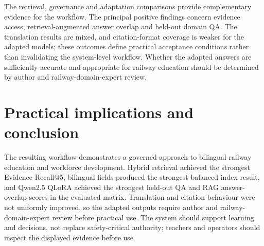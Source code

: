 The retrieval, governance and adaptation comparisons provide complementary evidence for the workflow. The principal positive findings concern evidence access, retrieval-augmented answer overlap and held-out domain QA. The translation results are mixed, and citation-format coverage is weaker for the adapted models; these outcomes define practical acceptance conditions rather than invalidating the system-level workflow. Whether the adapted answers are sufficiently accurate and appropriate for railway education should be determined by author and railway-domain-expert review.

\section{Practical implications and conclusion}

The resulting workflow demonstrates a governed approach to bilingual railway education and workforce development. Hybrid retrieval achieved the strongest Evidence Recall@5, bilingual fields produced the strongest balanced index result, and Qwen2.5 QLoRA achieved the strongest held-out QA and RAG answer-overlap scores in the evaluated matrix. Translation and citation behaviour were not uniformly improved, so the adapted outputs require author and railway-domain-expert review before practical use. The system should support learning and decisions, not replace safety-critical authority; teachers and operators should inspect the displayed evidence before use.
